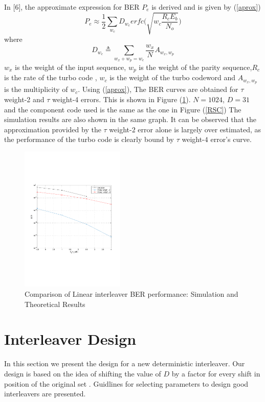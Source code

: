 \documentclass[technicalreport]{ieicej}
\begin{document}
In [6], the approximate expression for BER $P_e$ is derived and is given by
(\ref{aprox})
\begin{equation} 
 P_e \approx \frac{1}{2}\sum_{w_c}D_{w_c} 
  erfc \Bigg(\sqrt{w_c\frac{R_cE_b}{N_o}} \Bigg)
  \label{aprox}
  \end{equation}
 where 
  $$ D_{w_c}\triangleq \sum_{w_x+w_p=w_c} \frac{w_x}{N}A_{w_x,w_p}$$
  $w_x$ is the weight of the input sequence, $w_p$ is the weight of the parity 
  sequence,$R_c$ is the rate of the turbo code , $w_c$ is the weight of the turbo 
  codeword and $A_{w_x,w_p}$ is the multiplicity of $w_c$. Using (\ref{aprox}),
  The BER curves are obtained for $\tau$ weight-2 and $\tau$ weight-4 errors. 
  This is shown in Figure (\ref{comp}). $N=1024$, $D=31$ and the component code used is the
  same as the one in Figure (\ref{RSC})
  The simulation results are also shown in the same graph. It can be observed that
  the approximation provided by the $\tau$ weight-$2$ error alone is largely over estimated,
  as the performance of the turbo code is clearly bound by  $\tau$ weight-$4$ error's
  curve. 
\begin{figure}[h!]
\centering
		\includegraphics[height = 7cm,trim={0 7.2cm 0 6cm},clip]{D_31_N_1024_sim_VS_theory.pdf}
		\caption{Comparison of Linear interleaver BER performance: Simulation and Theoretical Results}
		\label{comp}
		\end{figure}
		
\section{Interleaver Design}
\label{sec}
In this section we present the design for a new deterministic interleaver. 
Our design is based on the idea of shifting the value of $D$ by a factor for every shift in position of the original set . Guidlines for selecting
parameters to design good interleavers are presented.  
\end{document}
